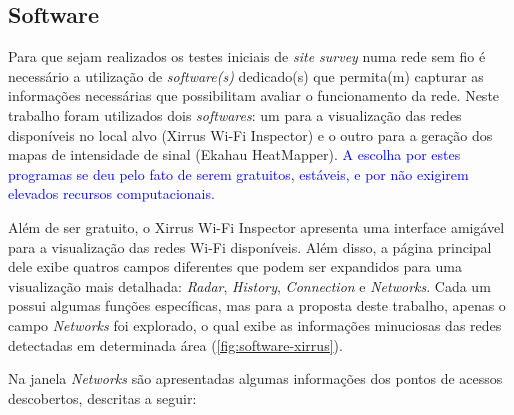 \subsection{Software}
\label{subsec:softwares-utiliados}

Para que sejam realizados os testes iniciais de \textit{site survey} numa rede sem fio é necessário a utilização de \textit{software(s)} dedicado(s) que permita(m) capturar as informações necessárias que possibilitam avaliar o funcionamento da rede. Neste trabalho foram utilizados dois \textit{softwares}: um para a visualização das redes disponíveis no local alvo (Xirrus Wi-Fi Inspector) e o outro para a geração dos mapas de intensidade de sinal (Ekahau HeatMapper). \textcolor{blue}{A escolha por estes programas se deu pelo fato de serem gratuitos, estáveis, e por não exigirem elevados recursos computacionais.}

Além de ser gratuito, o Xirrus Wi-Fi Inspector apresenta uma interface amigável para a visualização das redes Wi-Fi disponíveis. Além disso, a página principal dele exibe quatros campos diferentes que podem ser expandidos para uma visualização mais detalhada: \textit{Radar}, \textit{History}, \textit{Connection} e \textit{Networks}. Cada um possui algumas funções específicas, mas para a proposta deste trabalho, apenas o campo \textit{Networks} foi explorado, o qual exibe as informações minuciosas das redes detectadas em determinada área (\autoref{fig:software-xirrus}).

\begin{figure}[H]
	\centering
\end{figure}

Na janela \textit{Networks} são apresentadas algumas informações dos pontos de acessos descobertos, descritas a seguir:


